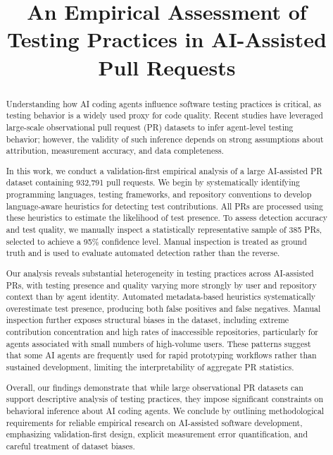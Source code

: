 \documentclass[conference]{IEEEtran}
\title{An Empirical Assessment of Testing Practices in AI-Assisted Pull Requests}
\begin{document}
\maketitle

\begin{abstract}
Understanding how AI coding agents influence software testing practices is critical, as testing behavior is a widely used proxy for code quality. Recent studies have leveraged large-scale observational pull request (PR) datasets to infer agent-level testing behavior; however, the validity of such inference depends on strong assumptions about attribution, measurement accuracy, and data completeness.

In this work, we conduct a validation-first empirical analysis of a large AI-assisted PR dataset containing 932,791 pull requests. We begin by systematically identifying programming languages, testing frameworks, and repository conventions to develop language-aware heuristics for detecting test contributions. All PRs are processed using these heuristics to estimate the likelihood of test presence. To assess detection accuracy and test quality, we manually inspect a statistically representative sample of 385 PRs, selected to achieve a 95\% confidence level. Manual inspection is treated as ground truth and is used to evaluate automated detection rather than the reverse.

Our analysis reveals substantial heterogeneity in testing practices across AI-assisted PRs, with testing presence and quality varying more strongly by user and repository context than by agent identity. Automated metadata-based heuristics systematically overestimate test presence, producing both false positives and false negatives. Manual inspection further exposes structural biases in the dataset, including extreme contribution concentration and high rates of inaccessible repositories, particularly for agents associated with small numbers of high-volume users. These patterns suggest that some AI agents are frequently used for rapid prototyping workflows rather than sustained development, limiting the interpretability of aggregate PR statistics.

Overall, our findings demonstrate that while large observational PR datasets can support descriptive analysis of testing practices, they impose significant constraints on behavioral inference about AI coding agents. We conclude by outlining methodological requirements for reliable empirical research on AI-assisted software development, emphasizing validation-first design, explicit measurement error quantification, and careful treatment of dataset biases.
\end{abstract}
\end{document}
